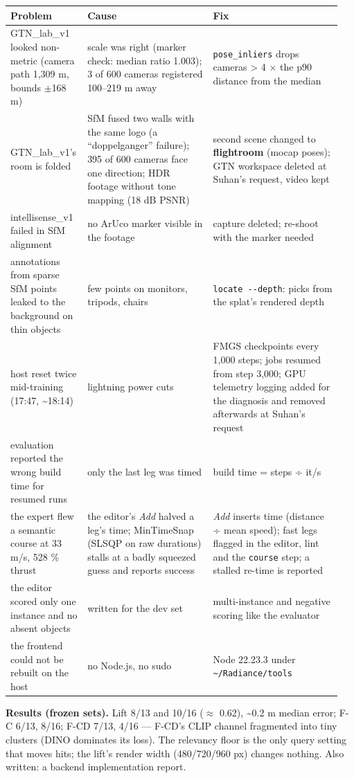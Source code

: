 \documentclass[11pt,a4paper]{article}
\newcommand{\code}[1]{\texttt{#1}}
\begin{document}
\begin{center}\small
\begin{tabular}{@{}>{\raggedright\arraybackslash}p{0.188\linewidth}>{\raggedright\arraybackslash}p{0.378\linewidth}>{\raggedright\arraybackslash}p{0.383\linewidth}@{}}
\toprule
\textbf{Problem} & \textbf{Cause} & \textbf{Fix} \\
\midrule
GTN\_lab\_v1 looked non-metric (camera path 1,309 m, bounds $\pm$168 m) & scale was right (marker check: median ratio 1.003); 3 of 600 cameras registered 100–219 m away & \code{pose\_\allowbreak{}inliers} drops cameras > 4 $\times$ the p90 distance from the median \\
GTN\_lab\_v1's room is folded & SfM fused two walls with the same logo (a ``doppelganger'' failure); 395 of 600 cameras face one direction; HDR footage without tone mapping (18 dB PSNR) & second scene changed to \textbf{flightroom} (mocap poses); GTN workspace deleted at Suhan's request, video kept \\
intellisense\_v1 failed in SfM alignment & no ArUco marker visible in the footage & capture deleted; re-shoot with the marker needed \\
annotations from sparse SfM points leaked to the background on thin objects & few points on monitors, tripods, chairs & \code{locate -{}-depth}: picks from the splat's rendered depth \\
host reset twice mid-training (17:47, \textasciitilde{}18:14) & lightning power cuts & FMGS checkpoints every 1,000 steps; jobs resumed from step 3,000; GPU telemetry logging added for the diagnosis and removed afterwards at Suhan's request \\
evaluation reported the wrong build time for resumed runs & only the last leg was timed & build time = steps ÷ it/s \\
the expert flew a semantic course at 33 m/s, 528 \% thrust & the editor's \emph{Add} halved a leg's time; MinTimeSnap (SLSQP on raw durations) stalls at a badly squeezed guess and reports success & \emph{Add} inserts time (distance ÷ mean speed); fast legs flagged in the editor, lint and the \code{course} step; a stalled re-time is reported \\
the editor scored only one instance and no absent objects & written for the dev set & multi-instance and negative scoring like the evaluator \\
the frontend could not be rebuilt on the host & no Node.js, no sudo & Node 22.23.3 under \code{\textasciitilde{}/\allowbreak{}Radiance/\allowbreak{}tools} \\
\bottomrule
\end{tabular}
\end{center}
\textbf{Results (frozen sets).} Lift 8/13 and 10/16 ($\approx$ 0.62), \textasciitilde{}0.2 m median error; F-C 6/13, 8/16; F-CD 7/13, 4/16 — F-CD's CLIP channel fragmented into tiny clusters (DINO dominates its loss). The relevancy floor is the only query setting that moves hits; the lift's render width (480/720/960 px) changes nothing. Also written: a backend implementation report.
\end{document}
